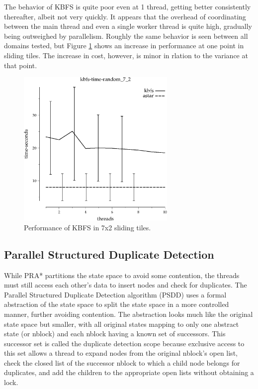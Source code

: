 \documentclass{article}
\begin{document}
The behavior of KBFS is quite poor even at 1 thread, getting better consistently thereafter, albeit not very quickly. It appears that the overhead of coordinating between the main thread and even a single worker thread is quite high, gradually being outweighed by parallelism. Roughly the same behavior is seen between all domains tested, but Figure \ref{fig:KBFS-tiles} shows an increase in performance at one point in sliding tiles. The increase in cost, however, is minor in rlation to the variance at that point.

\begin{figure}[h!]
\includegraphics[width=3in]{../graphs/seth/tiles-single/KBFS.eps}
\caption{Performance of KBFS in 7x2 sliding tiles.}
\label{fig:KBFS-tiles}
\end{figure}
\subsection{Parallel Structured Duplicate Detection}
While PRA* partitions the state space to avoid some contention, the threads must still access each other's data to insert nodes and check for duplicates. The Parallel Structured Duplicate Detection algorithm (PSDD) uses a formal abstraction of the state space to split the state space in a more controlled manner, further avoiding contention. The abstraction looks much like the original state space but smaller, with all original states mapping to only one abstract state (or nblock) and each nblock having a known set of successors. This successor set is called the duplicate detection scope because exclusive access to this set allows a thread to expand nodes from the original nblock's open list, check the closed list of the successor nblock to which a child node belongs for duplicates, and add the children to the appropriate open lists without obtaining a lock.
\end{document}
